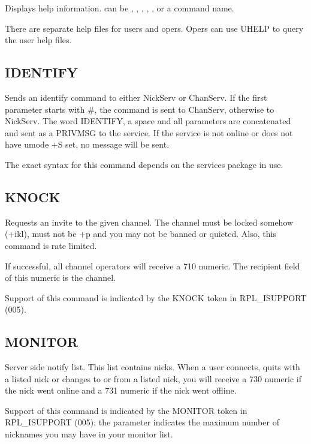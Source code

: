 	Displays help information.  can be ,
	, , , ,
	or a command name.

	There are separate help files for users and opers. Opers can use UHELP
	to query the user help files.

\subsection{IDENTIFY}
	 

	Sends an identify command to either NickServ or ChanServ. If the first
	parameter starts with \#, the command is sent to ChanServ, otherwise to
	NickServ. The word IDENTIFY, a space and all parameters are
	concatenated and sent as a PRIVMSG to the service. If the service is
	not online or does not have umode +S set, no message will be sent.

	The exact syntax for this command depends on the services package in
	use.


\subsection{KNOCK}


	Requests an invite to the given channel. The channel must be locked
	somehow (+ikl), must not be +p and you may not be banned or quieted.
	Also, this command is rate limited.

	If successful, all channel operators will receive a 710 numeric. The
	recipient field of this numeric is the channel.

	Support of this command is indicated by the KNOCK token in
	RPL\_ISUPPORT (005).


\subsection{MONITOR}

	Server side notify list. This list contains nicks. When a user
	connects, quits with a listed nick or changes to or from a listed nick,
	you will receive a 730 numeric if the nick went online and a 731
	numeric if the nick went offline.

	Support of this command is indicated by the MONITOR token in
	RPL\_ISUPPORT (005); the parameter indicates the maximum number of
	nicknames you may have in your monitor list.

